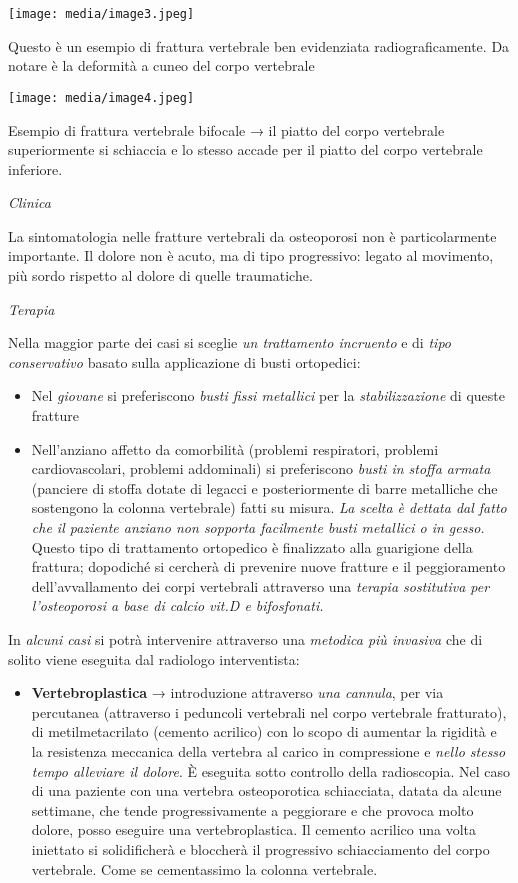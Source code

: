 \documentclass[]{article}
\begin{document}
\texttt{[image: media/image3.jpeg]}

Questo è un esempio di frattura vertebrale ben evidenziata
radiograficamente. Da notare è la deformità a cuneo del corpo vertebrale

\texttt{[image: media/image4.jpeg]}

Esempio di frattura vertebrale bifocale → il piatto del corpo vertebrale
superiormente si schiaccia e lo stesso accade per il piatto del corpo
vertebrale inferiore.

\emph{Clinica}

La sintomatologia nelle fratture vertebrali da osteoporosi non è
particolarmente importante. Il dolore non è acuto, ma di tipo
progressivo: legato al movimento, più sordo rispetto al dolore di quelle
traumatiche.

\emph{Terapia}

Nella maggior parte dei casi si sceglie \emph{un trattamento incruento}
e di \emph{tipo conservativo} basato sulla applicazione di busti
ortopedici:

\begin{itemize}
\item
  Nel \emph{giovane} si preferiscono \emph{busti fissi metallici} per la
  \emph{stabilizzazione} di queste fratture
\item
  Nell'anziano affetto da comorbilità (problemi respiratori, problemi
  cardiovascolari, problemi addominali) si preferiscono \emph{busti in
  stoffa armata} (panciere di stoffa dotate di legacci e posteriormente
  di barre metalliche che sostengono la colonna vertebrale) fatti su
  misura. \emph{La scelta è dettata dal fatto che il paziente anziano
  non sopporta facilmente busti metallici o in gesso.} Questo tipo di
  trattamento ortopedico è finalizzato alla guarigione della frattura;
  dopodiché si cercherà di prevenire nuove fratture e il peggioramento
  dell'avvallamento dei corpi vertebrali attraverso una \emph{terapia
  sostitutiva per l'osteoporosi a base di calcio vit.D e bifosfonati.}
\end{itemize}

In \emph{alcuni casi} si potrà intervenire attraverso una \emph{metodica
più invasiva} che di solito viene eseguita dal radiologo interventista:

\begin{itemize}
\item
  \textbf{Vertebroplastica} → introduzione attraverso \emph{una
  cannula}, per via percutanea (attraverso i peduncoli vertebrali nel
  corpo vertebrale fratturato), di metilmetacrilato (cemento acrilico)
  con lo scopo di aumentar la rigidità e la resistenza meccanica della
  vertebra al carico in compressione e \emph{nello stesso tempo
  alleviare il dolore}. È eseguita sotto controllo della radioscopia.
  Nel caso di una paziente con una vertebra osteoporotica schiacciata,
  datata da alcune settimane, che tende progressivamente a peggiorare e
  che provoca molto dolore, posso eseguire una vertebroplastica. Il
  cemento acrilico una volta iniettato si solidificherà e bloccherà il
  progressivo schiacciamento del corpo vertebrale. Come se cementassimo
  la colonna vertebrale.
\end{itemize}
\end{document}
